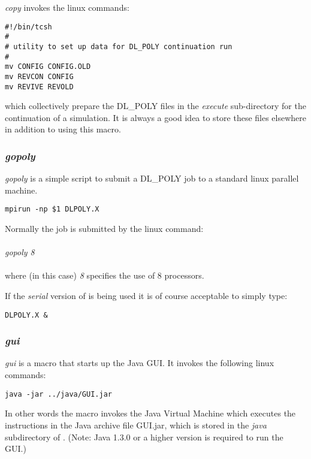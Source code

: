 {\sl copy} invokes the linux commands:

\begin{verbatim}
#!/bin/tcsh
#
# utility to set up data for DL_POLY continuation run
#
mv CONFIG CONFIG.OLD
mv REVCON CONFIG
mv REVIVE REVOLD
\end{verbatim}

\noindent which collectively prepare the DL\_POLY files in the {\em execute}
sub-directory for the continuation of a simulation. It is
always a good idea to store these files elsewhere in addition to using this
macro.

\subsubsection{{\sl gopoly}}

{\sl gopoly} is a simple script to submit a DL\_POLY job to a standard linux parallel machine.

\begin{verbatim}
mpirun -np $1 DLPOLY.X
\end{verbatim}

\noindent Normally the job is submitted by the linux command:\\~\\
{\sl gopoly  8}\\~\\
\noindent where (in this case) {\sl 8} specifies the use of 8 processors.

If the {\em serial} version of \DD{} is being used it is of course
acceptable to simply type:

\begin{verbatim}
DLPOLY.X &
\end{verbatim}

\subsubsection{\sl gui}

{\sl gui} is a macro that starts up the \D{} Java GUI. It invokes the
following linux commands:

\begin{verbatim}
java -jar ../java/GUI.jar
\end{verbatim}

In other words the macro invokes the Java Virtual Machine which
executes the instructions in the Java archive file GUI.jar, which is
stored in the {\em java} subdirectory of \D{}. (Note: Java 1.3.0 or a
higher version is required to run the GUI.)

